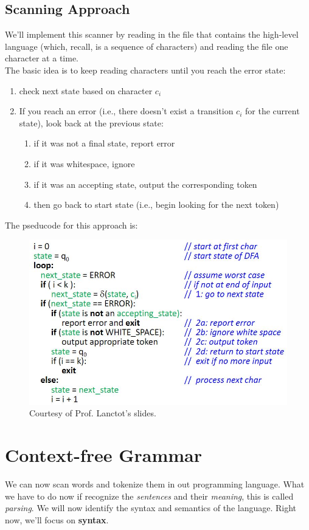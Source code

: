 \documentclass{report}
\begin{document}
\subsection{Scanning Approach}
We'll implement this scanner by reading in the file that contains the high-level language (which, recall, is a sequence of characters) and reading the file one character at a time.\\
The basic idea is to keep reading characters until you reach the error state:
\begin{enumerate}
\item check next state based on character $c_i$
\item If you reach an error (i.e., there doesn't exist a transition $c_i$ for the current state), look back at the previous state:
\begin{enumerate}
\item if it was not a final state, report error
\item if it was whitespace, ignore
\item if it was an accepting state, output the corresponding token
\item then go back to start state (i.e., begin looking for the next token)
\end{enumerate}
\end{enumerate}
The pseducode for this approach is:
\begin{figure}[ht]
\begin{center}
\includegraphics[scale=0.4]{scan1.jpg}
\end{center}
\caption{Courtesy of Prof. Lanctot's slides.}
\end{figure}\newpage
\section{Context-free Grammar}
We can now scan words and tokenize them in out programming language. What we have to do now if recognize the \textit{sentences} and their \textit{meaning}, this is called \textit{parsing}. We will now identify the syntax and semantics of the language. Right now, we'll focus on \textbf{syntax}.
\end{document}
